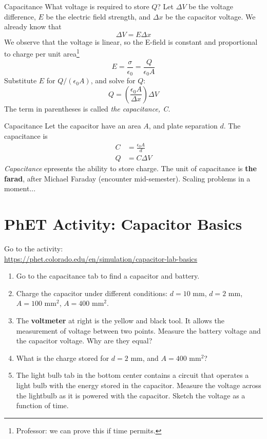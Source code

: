 \documentclass{beamer}
\begin{document}
\begin{frame}{Capacitance}
What voltage is required to store $Q$? Let $\Delta V$ be the voltage difference, $E$ be the electric field strength, and $\Delta x$ be the capacitor voltage.  We already know that
\begin{equation}
\Delta V = E\Delta x
\end{equation}
We observe that the voltage is linear, so the E-field is constant and proportional to charge per unit area\footnote{Professor: we can prove this if time permits.}
\begin{equation}
E = \frac{\sigma}{\epsilon_0} = \frac{Q}{\epsilon_0 A}
\end{equation}
Substitute $E$ for $Q/(\epsilon_0 A)$, and solve for $Q$:
\begin{equation}
Q = \left( \frac{\epsilon_0 A}{\Delta x} \right) \Delta V
\end{equation}
The term in parentheses is called \textit{the capacitance, C.} \vspace{0.5cm}
\end{frame}

\begin{frame}{Capacitance}
Let the capacitor have an area $A$, and plate separation $d$.  The capacitance is
\begin{align}
C &= \frac{\epsilon_0 A}{d} \\
Q &= C \Delta V
\end{align}
\textit{Capacitance} epresents the ability to store charge.  The unit of capacitance is \textbf{the farad}, after Michael Faraday (encounter mid-semester).  Scaling problems in a moment...
\end{frame}

\section{PhET Activity: Capacitor Basics}

\begin{frame}
\small
Go to the activity: \\ \vspace{0.5cm}
\url{https://phet.colorado.edu/en/simulation/capacitor-lab-basics}
\begin{enumerate}
\item Go to the capacitance tab to find a capacitor and battery.
\item Charge the capacitor under different conditions: $d=10$ mm, $d=2$ mm, $A=100$ mm$^2$, $A=400$ mm$^2$.
\item The \textbf{voltmeter} at right is the yellow and black tool.  It allows the measurement of voltage between two points.  Measure the battery voltage and the capacitor voltage.  Why are they equal?
\item What is the charge stored for $d=2$ mm, and $A=400$ mm$^2$?
\item The light bulb tab in the bottom center contains a circuit that operates a light bulb with the energy stored in the capacitor.  Measure the voltage across the lightbulb as it is powered with the capacitor.  Sketch the voltage as a function of time.
\end{enumerate}
\end{frame}
\end{document}
